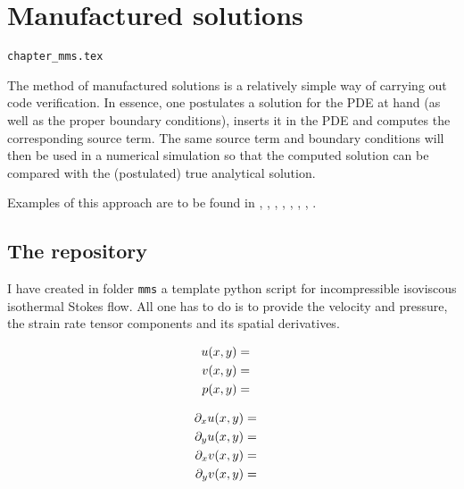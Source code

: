 \chapter{Manufactured solutions \label{mms}} 

\begin{flushright} {\tiny {\color{gray} \tt chapter\_mms.tex}} \end{flushright}

The method of manufactured solutions is a relatively simple way of carrying out
code verification. In essence, one postulates a solution for the PDE at hand (as
well as the proper boundary conditions), inserts it in the PDE and computes the 
corresponding source term. 
The same source term and boundary conditions will then be used in a numerical 
simulation so that the computed solution can be compared with the (postulated)
true analytical solution. 

Examples of this approach are to be found in 
\textcite{dohu03}, \textcite{busa13}, \textcite{bodg06}, \textcite{polp14},
\textcite{polp14b}, \textcite{lopp14}, \textcite{blmp16}, \textcite{thba22}.

\section{The repository}

I have created in folder {\tt mms} a template python script for incompressible
isoviscous isothermal Stokes flow. All one has to do is to provide the velocity and 
pressure, the strain rate tensor components and its spatial derivatives.



\begin{eqnarray}
u(x,y) &=&  \nonumber\\
v(x,y) &=&  \nonumber\\
p(x,y) &=&  \nonumber
\end{eqnarray}

\begin{eqnarray}
\partial_x u (x,y)&=& \nonumber\\
\partial_y u (x,y)&=& \nonumber\\
\partial_x v (x,y)&=& \nonumber\\
\partial_y v (x,y)&=& \nonumber
\end{eqnarray}

